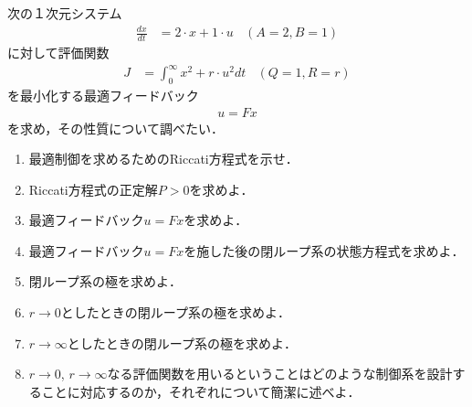 \item
次の１次元システム
\begin{align}
	\frac{dx}{dt} &= 2 \cdot x + 1 \cdot u
	\ \ \ \  (A=2, B=1) 
\nonumber
\end{align}
に対して評価関数
\begin{align}
	J &= \int_0^\infty x^2 + r \cdot u^2 dt
	\ \ \ \  (Q=1, R=r)
\nonumber
\end{align}
を最小化する最適フィードバック
\begin{align}
	u=Fx
\nonumber
\end{align}
を求め，その性質について調べたい．

\begin{enumerate}
\item 
最適制御を求めるためのRiccati方程式を示せ．
\vspace{3cm}

\item
Riccati方程式の正定解$P>0$を求めよ．
\vspace{8cm}

\item
最適フィードバック$u=Fx$を求めよ．
\vspace{4cm}

\item
最適フィードバック$u=Fx$を施した後の閉ループ系の状態方程式を求めよ．
\vspace{4cm}

\vfill\null
\columnbreak

\item
閉ループ系の極を求めよ．
\vspace{2cm}

\item
$r\rightarrow 0$としたときの閉ループ系の極を求めよ．
\vspace{2cm}

\item
$r \rightarrow \infty$としたときの閉ループ系の極を求めよ．
\vspace{2cm}

\item
$r\rightarrow 0$, $r \rightarrow \infty$なる評価関数を用いるということはどのような制御系を設計することに対応するのか，それぞれについて簡潔に述べよ．
\vspace{1cm}
\end{enumerate}

